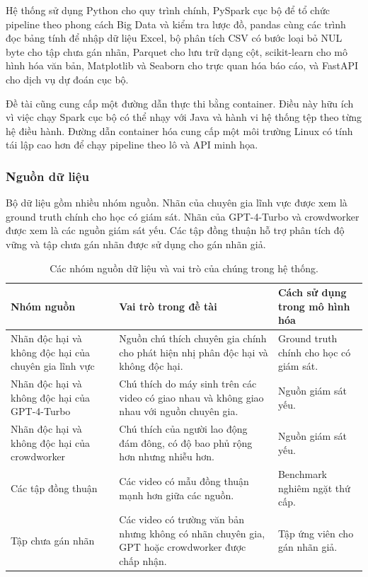Hệ thống sử dụng Python cho quy trình chính, PySpark cục bộ để tổ chức pipeline theo phong cách Big Data và kiểm tra lược đồ, pandas cùng các trình đọc bảng tính để nhập dữ liệu Excel, bộ phân tích CSV có bước loại bỏ NUL byte cho tập chưa gán nhãn, Parquet cho lưu trữ dạng cột, scikit-learn cho mô hình hóa văn bản, Matplotlib và Seaborn cho trực quan hóa báo cáo, và FastAPI cho dịch vụ dự đoán cục bộ.

Đề tài cũng cung cấp một đường dẫn thực thi bằng container. Điều này hữu ích vì việc chạy Spark cục bộ có thể nhạy với Java và hành vi hệ thống tệp theo từng hệ điều hành. Đường dẫn container hóa cung cấp một môi trường Linux có tính tái lập cao hơn để chạy pipeline theo lô và API minh họa.

\subsubsection{Nguồn dữ liệu}

Bộ dữ liệu gồm nhiều nhóm nguồn. Nhãn của chuyên gia lĩnh vực được xem là ground truth chính cho học có giám sát. Nhãn của GPT-4-Turbo và crowdworker được xem là các nguồn giám sát yếu. Các tập đồng thuận hỗ trợ phân tích độ vững và tập chưa gán nhãn được sử dụng cho gán nhãn giả.

\begin{table}[H]
\centering
\small
\renewcommand{\arraystretch}{1.25}
\begin{tabularx}{\textwidth}{|>{\raggedright\arraybackslash}p{3.2cm}|>{\raggedright\arraybackslash}X|>{\raggedright\arraybackslash}p{3.2cm}|}
\hline
\textbf{Nhóm nguồn} & \textbf{Vai trò trong đề tài} & \textbf{Cách sử dụng trong mô hình hóa} \\
\hline
Nhãn độc hại và không độc hại của chuyên gia lĩnh vực & Nguồn chú thích chuyên gia chính cho phát hiện nhị phân độc hại và không độc hại. & Ground truth chính cho học có giám sát. \\
\hline
Nhãn độc hại và không độc hại của GPT-4-Turbo & Chú thích do máy sinh trên các video có giao nhau và không giao nhau với nguồn chuyên gia. & Nguồn giám sát yếu. \\
\hline
Nhãn độc hại và không độc hại của crowdworker & Chú thích của người lao động đám đông, có độ bao phủ rộng hơn nhưng nhiễu hơn. & Nguồn giám sát yếu. \\
\hline
Các tập đồng thuận & Các video có mẫu đồng thuận mạnh hơn giữa các nguồn. & Benchmark nghiêm ngặt thứ cấp. \\
\hline
Tập chưa gán nhãn & Các video có trường văn bản nhưng không có nhãn chuyên gia, GPT hoặc crowdworker được chấp nhận. & Tập ứng viên cho gán nhãn giả. \\
\hline
\end{tabularx}
\caption{Các nhóm nguồn dữ liệu và vai trò của chúng trong hệ thống.}
\label{tab:implementation-source-groups}
\end{table}

